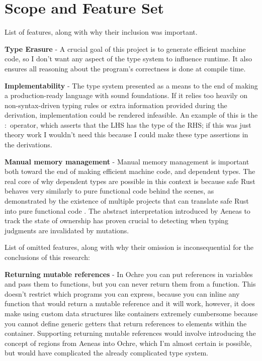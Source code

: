 \documentclass[12pt,twoside]{report}
\begin{document}
\section{Scope and Feature Set}
List of features, along with why their inclusion was important.

\textbf{Type Erasure} - A crucial goal of this project is to generate efficient machine code, so I don't want any aspect of the type system to influence runtime. It also ensures all reasoning about the program's correctness is done at compile time.

\textbf{Implementability} - The type system presented as a means to the end of making a production-ready language with sound foundations. If it relies too heavily on non-syntax-driven typing rules or extra information provided during the derivation, implementation could be rendered infeasible. An example of this is the $:$ operator, which asserts that the LHS has the type of the RHS; if this was just theory work I wouldn't need this because I could make these type assertions in the derivations.

\textbf{Manual memory management} - Manual memory management is important both toward the end of making efficient machine code, and dependent types. The real core of why dependent types are possible in this context is because safe Rust behaves very similarly to pure functional code behind the scenes, as demonstrated by the existence of multiple projects that can translate safe Rust into pure functional code \citep{aeneas}\citep{ullrichKhaElectrolysis2024}. The abstract interpretation introduced by Aeneas to track the state of ownership has proven crucial to detecting when typing judgments are invalidated by mutations.

List of omitted features, along with why their omission is inconsequential for the conclusions of this research:

\textbf{Returning mutable references} - In Ochre you can put references in variables and pass them to functions, but you can never return them from a function. This doesn't restrict which programs you can express, because you can inline any function that would return a mutable reference and it will work, however, it does make using custom data structures like containers extremely cumbersome because you cannot define generic getters that return references to elements within the container. Supporting returning mutable references would involve introducing the concept of regions from Aeneas into Ochre, which I'm almost certain is possible, but would have complicated the already complicated type system.
\end{document}
